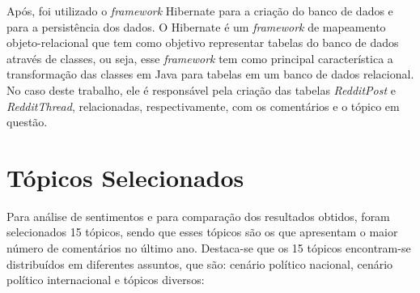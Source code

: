 Após, foi utilizado o \textit{framework} Hibernate
\cite{Iverson:2004:HJD:1044870} para a criação do banco de dados e para a
persistência dos dados. O Hibernate é um \textit{framework} de
mapeamento objeto-relacional que tem como objetivo representar tabelas do banco
de dados através de classes, ou seja, esse \textit{framework} tem como principal
característica a transformação das classes em Java para tabelas em um banco de dados relacional.
No caso deste trabalho, ele é responsável pela criação das tabelas \textit{RedditPost} e
\textit{RedditThread}, relacionadas, respectivamente, com os comentários e o
tópico em questão. 

\section{Tópicos Selecionados}

Para análise de sentimentos e para comparação dos resultados obtidos, foram
selecionados 15 tópicos, sendo que esses tópicos são os que
apresentam o maior número de comentários no último ano. Destaca-se que os 15
tópicos encontram-se distribuídos em diferentes assuntos, que são: cenário
político nacional, cenário político internacional e tópicos diversos:

